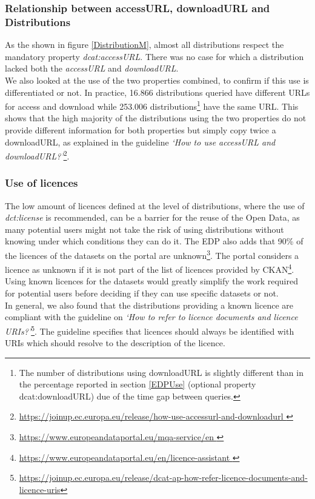 \documentclass[<options>]{elsarticle}
\begin{document}
\subsubsection{Relationship between accessURL, downloadURL and Distributions}

As the shown in figure \ref{DistributionM}, almost all distributions respect the mandatory property \textit{dcat:accessURL}. There was no case for which a distribution lacked both the \textit{accessURL} and \textit{downloadURL}.\\
We also looked at the use of the two properties combined, to confirm if this use is differentiated or not. In practice, 16.866 distributions queried have different URLs for access and download while 253.006 distributions\footnote{The number of distributions using downloadURL is slightly different than in the percentage reported in section \ref{EDPUse} (optional property dcat:downloadURL) due of the time gap between queries.}  have the same URL. This shows that the high majority of the distributions using the two properties do not provide different information for both properties but simply copy twice a downloadURL, as explained in the guideline \textit{‘How to use accessURL and downloadURL?'}\footnote{\href{   https://joinup.ec.europa.eu/release/how-use-accessurl-and-downloadurl }{https://joinup.ec.europa.eu/release/how-use-accessurl-and-downloadurl }}.

\subsubsection{Use of licences}
The low amount of licences defined at the level of distributions, where the use of \textit{dct:license} is recommended, can be a barrier for the reuse of the Open Data, as many potential users might not take the risk of using distributions without knowing under which conditions they can do it. The EDP also adds that 90\% of the licences of the datasets on the portal are unknown\footnote{\href{https://www.europeandataportal.eu/mqa-service/en}{ https://www.europeandataportal.eu/mqa-service/en }}. The portal considers a licence as unknown if it is not part of the list of licences provided by CKAN\footnote{\href{https://www.europeandataportal.eu/en/licence-assistant}{ https://www.europeandataportal.eu/en/licence-assistant }}. Using known licences for the datasets would greatly simplify the work required for potential users before deciding if they can use specific datasets or not.\\
In general, we also found that the distributions providing a known licence are compliant with the guideline on \textit{‘How to refer to licence documents and licence URIs?’}\footnote{\href{https://joinup.ec.europa.eu/release/dcat-ap-how-refer-licence-documents-and-licence-uris}{  https://joinup.ec.europa.eu/release/dcat-ap-how-refer-licence-documents-and-licence-uris}}. The guideline specifies that licences should always be identified with URIs which should resolve to the description of the licence.
\end{document}
